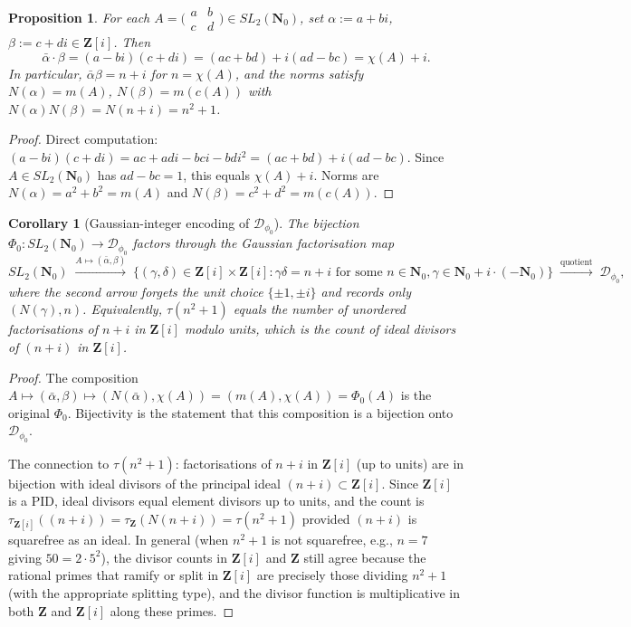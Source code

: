 \documentclass[11pt]{article}
\newtheorem{proposition}[theorem]{Proposition}
\newtheorem{corollary}[theorem]{Corollary}
\theoremstyle{definition}
\newcommand{\Nz}{\mathbf{N}_0}
\newcommand{\Z}{\mathbf{Z}}
\newcommand{\SLNz}{SL_2(\Nz)}
\newcommand{\Dphi}{\mathcal{D}_{\phi_0}}
\newcommand{\Phzero}{\Phi_0}
\newcommand{\Zi}{\Z[i]}
\begin{document}
\begin{proposition}\label{prop:gauss-factor}
For each $A = \bigl(\begin{smallmatrix}a&b\\c&d\end{smallmatrix}\bigr) \in \SLNz$, set $\alpha := a+bi$, $\beta := c+di \in \Zi$. Then
\begin{equation}\label{eq:bar-alpha-beta}
\bar\alpha \cdot \beta = (a-bi)(c+di) = (ac+bd) + i(ad-bc) = \chi(A) + i.
\end{equation}
In particular, $\bar\alpha \beta = n + i$ for $n = \chi(A)$, and the norms satisfy $N(\alpha) = m(A)$, $N(\beta) = m(c(A))$ with $N(\alpha) N(\beta) = N(n+i) = n^2+1$.
\end{proposition}

\begin{proof}
Direct computation: $(a-bi)(c+di) = ac + adi - bci - bdi^2 = (ac+bd) + i(ad-bc)$. Since $A \in \SLNz$ has $ad-bc = 1$, this equals $\chi(A) + i$. Norms are $N(\alpha) = a^2+b^2 = m(A)$ and $N(\beta) = c^2+d^2 = m(c(A))$.
\end{proof}

\begin{corollary}[Gaussian-integer encoding of $\Dphi$]\label{cor:gauss-encoding}
The bijection $\Phzero: \SLNz \to \Dphi$ factors through the Gaussian factorisation map
\[
\SLNz \;\xrightarrow{A \mapsto (\bar\alpha,\beta)}\; \{(\gamma, \delta) \in \Zi \times \Zi : \gamma \delta = n+i \text{ for some } n \in \Nz, \gamma \in \Nz + i \cdot (-\Nz)\} \;\xrightarrow{\text{quotient}}\; \Dphi,
\]
where the second arrow forgets the unit choice $\{\pm 1, \pm i\}$ and records only $(N(\gamma), n)$. Equivalently, $\tau(n^2+1)$ equals the number of unordered factorisations of $n+i$ in $\Zi$ modulo units, which is the count of ideal divisors of $(n+i)$ in $\Zi$.
\end{corollary}

\begin{proof}
The composition $A \mapsto (\bar\alpha, \beta) \mapsto (N(\bar\alpha), \chi(A)) = (m(A), \chi(A)) = \Phzero(A)$ is the original $\Phzero$. Bijectivity \cite[Theorem 2.7]{shakov} is the statement that this composition is a bijection onto $\Dphi$.

The connection to $\tau(n^2+1)$: factorisations of $n+i$ in $\Zi$ (up to units) are in bijection with ideal divisors of the principal ideal $(n+i) \subset \Zi$. Since $\Zi$ is a PID, ideal divisors equal element divisors up to units, and the count is $\tau_{\Zi}((n+i)) = \tau_\Z(N(n+i)) = \tau(n^2+1)$ provided $(n+i)$ is squarefree as an ideal. In general (when $n^2+1$ is not squarefree, e.g., $n=7$ giving $50 = 2\cdot 5^2$), the divisor counts in $\Zi$ and $\Z$ still agree because the rational primes that ramify or split in $\Zi$ are precisely those dividing $n^2+1$ (with the appropriate splitting type), and the divisor function is multiplicative in both $\Z$ and $\Zi$ along these primes.
\end{proof}
\end{document}
